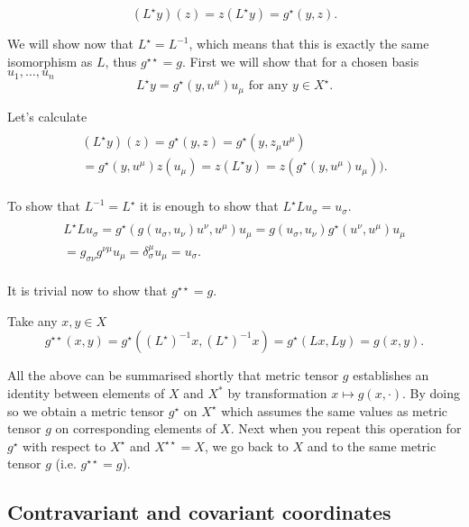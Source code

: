 \documentclass[main.tex]{subfiles}
\begin{document}
\begin{equation}
(L^\star y)(z) = z(L^\star y) = g^\star(y, z).
\end{equation}

We will show now that $L^\star = L^{-1}$, which means that this is exactly the same isomorphism as $L$, thus $g^{\star\star} = g$.  First we will show that for a chosen basis $u_1, \dots, u_n$
\begin{equation}
L^\star y = g^\star(y, u^\mu) u_\mu \text{ for any } y\in X^\star.
\end{equation}

Let's calculate
\begin{multline}
\\
(L^\star y)(z) = g^\star(y, z) = g^\star(y, z_\mu u^\mu)\\ 
= g^\star(y, u^\mu) z(u_\mu) = z(L^\star y) =
z(g^\star(y, u^\mu) u_\mu)). \\
\end{multline}

To show that $L^{-1} = L^\star$ it is enough to show that $L^\star L u_\sigma = u_\sigma$.
\begin{multline*}\\
L^\star L u_\sigma = g^\star(g(u_\sigma, u_\nu)u^\nu, u^\mu)u_\mu = g(u_\sigma, u_\nu) g^\star(u^\nu, u^\mu)u_\mu\\
 = g_{\sigma \nu} g^{\nu\mu} u_\mu = \delta_\sigma^\mu u_\mu = u_\sigma.
\\
\end{multline*}

It is trivial now to show that $g^{\star\star} = g$.

Take any $x, y\in X$ 
\begin{equation}
g^{\star\star}(x, y) = g^\star((L^\star)^{-1}x, (L^\star)^{-1}x) = g^\star(Lx, Ly) = g(x, y).
\end{equation}

All the above can be summarised shortly that metric tensor $g$ establishes an identity between elements of $X$ and $X^*$ by transformation $x\mapsto g(x, \cdot)$. By doing so we obtain a metric tensor $g^\star$ on $X^\star$ which assumes the same values as metric tensor $g$ on corresponding elements of $X$. Next when you repeat this operation for $g^\star$ with respect to $X^\star$ and $X^{\star\star} = X$, we go back to $X$ and to the same metric tensor $g$ (i.e. $g^{\star\star} = g$).

\subsection{Contravariant and covariant coordinates}
\end{document}
